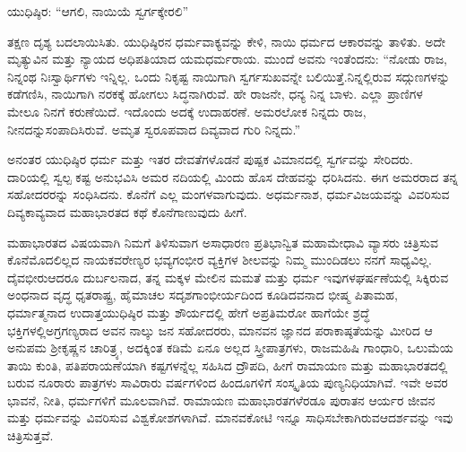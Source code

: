 \vskip 0.1cm

ಯುಧಿಷ್ಠಿರ: “ಆಗಲಿ, ನಾಯಿಯೆ ಸ್ವರ್ಗಕ್ಕೇರಲಿ”

\vskip 0.1cm

ತಕ್ಷಣ ದೃಶ್ಯ ಬದಲಾಯಿಸಿತು. ಯುಧಿಷ್ಠಿರನ ಧರ್ಮವಾಕ್ಯವನ್ನು ಕೇಳಿ, ನಾಯಿ ಧರ್ಮದ ಆಕಾರವನ್ನು ತಾಳಿತು. ಅದೇ ಮೃತ್ಯುವಿನ ಮತ್ತು ನ್ಯಾಯದ ಅಧಿಪತಿಯಾದ ಯಮಧರ್ಮರಾಯ. ಮುಂದೆ ಅವನು ಇಂತೆಂದನು: “ನೋಡು ರಾಜ, ನಿನ್ನಂಥ ನಿಃಸ್ವಾರ್ಥಿಗಳು ಇನ್ನಿಲ್ಲ. ಒಂದು ನಿಕೃಷ್ಟ ನಾಯಿಗಾಗಿ ಸ್ವರ್ಗಸುಖವನ್ನೇ ಬಲಿಯಿತ್ತೆ.\break ನಿನ್ನಲ್ಲಿರುವ ಸದ್ಗುಣಗಳನ್ನು ಕಡೆಗಣಿಸಿ, ನಾಯಿಗಾಗಿ ನರಕಕ್ಕೆ ಹೋಗಲು ಸಿದ್ಧ\-ನಾಗಿರುವೆ. ಹೇ ರಾಜನೇ, ಧನ್ಯ ನಿನ್ನ ಬಾಳು. ಎಲ್ಲಾ ಪ್ರಾಣಿಗಳ ಮೇಲೂ ನಿನಗೆ ಕರುಣೆಯಿದೆ. ಇದೊಂದು ಅದಕ್ಕೆ ಉದಾಹರಣೆ. ಅಮರಲೋಕ ನಿನ್ನದು ರಾಜ, ನೀನದನ್ನು\break ಸಂಪಾದಿಸಿರುವೆ. ಅಮೃತ ಸ್ವರೂಪವಾದ ದಿವ್ಯವಾದ ಗುರಿ ನಿನ್ನದು.”

\vskip 0.1cm

ಅನಂತರ ಯುಧಿಷ್ಠಿರ ಧರ್ಮ ಮತ್ತು ಇತರ ದೇವತೆಗಳೊಡನೆ ಪುಷ್ಪಕ ವಿಮಾನದಲ್ಲಿ ಸ್ವರ್ಗವನ್ನು ಸೇರಿದರು. ದಾರಿಯಲ್ಲಿ ಸ್ವಲ್ಪ ಕಷ್ಟ ಅನುಭವಿಸಿ ಅಮರ ನದಿಯಲ್ಲಿ ಮಿಂದು ಹೊಸ ದೇಹವನ್ನು ಧರಿಸಿದನು. ಈಗ ಅಮರರಾದ ತನ್ನ ಸಹೋದರರನ್ನು ಸಂಧಿಸಿದನು. ಕೊನೆಗೆ ಎಲ್ಲ ಮಂಗಳವಾಗುವುದು. ಅಧರ್ಮನಾಶ, ಧರ್ಮವಿಜಯವನ್ನು ವಿವರಿಸುವ ದಿವ್ಯಕಾವ್ಯವಾದ ಮಹಾಭಾರತದ ಕಥೆ ಕೊನೆಗಾಣುವುದು ಹೀಗೆ.

ಮಹಾಭಾರತದ ವಿಷಯವಾಗಿ ನಿಮಗೆ ತಿಳಿಸುವಾಗ ಅಸಾಧಾರಣ ಪ್ರತಿಭಾನ್ವಿತ ಮಹಾಮೇಧಾವಿ ವ್ಯಾಸರು ಚಿತ್ರಿಸುವ ಕೊನೆಮೊದಲಿಲ್ಲದ ನಾಯಕವರೇಣ್ಯರ ಭವ್ಯಗಂಭೀರ ವ್ಯಕ್ತಿಗಳ ಶೀಲವನ್ನು ನಿಮ್ಮ ಮುಂದಿಡಲು ನನಗೆ ಸಾಧ್ಯವಿಲ್ಲ. ದೈವಭೀರು\break ಆದರೂ ದುರ್ಬಲನಾದ, ತನ್ನ ಮಕ್ಕಳ ಮೇಲಿನ ಮಮತೆ ಮತ್ತು ಧರ್ಮ ಇವುಗಳ\break ಘರ್ಷಣೆಯಲ್ಲಿ ಸಿಕ್ಕಿರುವ ಅಂಧನಾದ ವೃದ್ಧ ಧೃತರಾಷ್ಟ್ರ, ಹೈಮಾಚಲ ಸದೃಶ\break ಗಾಂಭೀರ್ಯದಿಂದ ಕೂಡಿದವನಾದ ಭೀಷ್ಮ ಪಿತಾಮಹ, ಧರ್ಮಾತ್ಮನಾದ ಉದಾತ್ತ\break ಯುಧಿಷ್ಠಿರ ಮತ್ತು ಶೌರ್ಯದಲ್ಲಿ ಹೇಗೆ ಅಪ್ರತಿಮರೋ ಹಾಗೆಯೇ ಶ್ರದ್ಧೆ ಭಕ್ತಿಗಳಲ್ಲಿ\break ಅಗ್ರಗಣ್ಯರಾದ ಅವನ ನಾಲ್ಕು ಜನ ಸಹೋದರರು, ಮಾನವನ ಜ್ಞಾನದ ಪರಾಕಾಷ್ಠತೆಯನ್ನು ಮೀರಿದ ಆ ಅನುಪಮ ಶ‍್ರೀಕೃಷ್ಣನ ಚಾರಿತ್ರ್ಯ, ಅದಕ್ಕಿಂತ ಕಡಿಮೆ ಏನೂ ಅಲ್ಲದ ಸ್ತ್ರೀಪಾತ್ರಗಳು, ರಾಜಮಹಿಷಿ ಗಾಂಧಾರಿ, ಒಲುಮೆಯ ತಾಯಿ ಕುಂತಿ, ಪತಿಪರಾಯಣೆ\-ಯಾಗಿ ಕಷ್ಟಗಳನ್ನೆಲ್ಲ ಸಹಿಸಿದ ದ್ರೌಪದಿ, ಹೀಗೆ ರಾಮಾಯಣ ಮತ್ತು ಮಹಾಭಾರತದಲ್ಲಿ ಬರುವ ನೂರಾರು ಪಾತ್ರಗಳು ಸಾವಿರಾರು ವರ್ಷಗಳಿಂದ ಹಿಂದೂಗಳಿಗೆ ಸಂಸ್ಕೃತಿಯ ಪುಣ್ಯನಿಧಿಯಾಗಿವೆ. ಇವೇ ಅವರ ಭಾವನೆ, ನೀತಿ, ಧರ್ಮಗಳಿಗೆ ಮೂಲವಾಗಿವೆ. ರಾಮಾಯಣ ಮಹಾಭಾರತಗಳೆರಡೂ ಪುರಾತನ ಆರ್ಯರ ಜೀವನ ಮತ್ತು ಧರ್ಮವನ್ನು ವಿವರಿಸುವ ವಿಶ್ವಕೋಶಗಳಾಗಿವೆ. ಮಾನವಕೋಟಿ ಇನ್ನೂ ಸಾಧಿಸಬೇಕಾಗಿರುವ\break ಆದರ್ಶವನ್ನು ಇವು ಚಿತ್ರಿಸುತ್ತವೆ.

